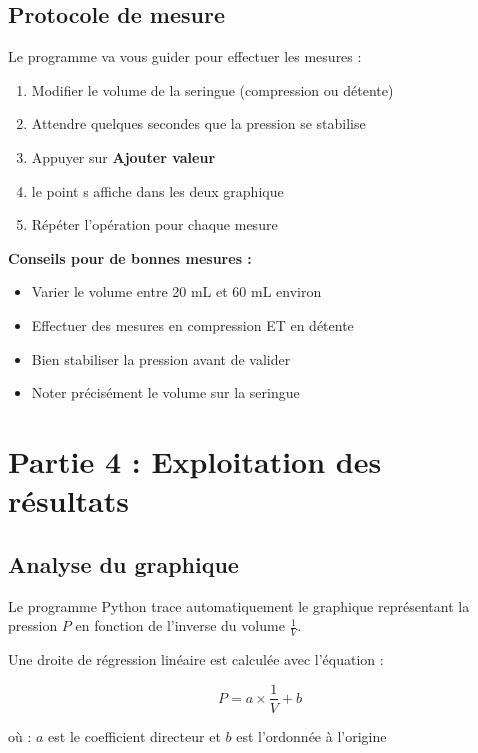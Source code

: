 \documentclass[11pt,a4paper]{article}
\begin{document}
\subsection{Protocole de mesure}

Le programme va vous guider pour effectuer les mesures :

\begin{enumerate}
    \item Modifier le volume de la seringue (compression ou détente)
    \item Attendre quelques secondes que la pression se stabilise
    \item Appuyer sur \textbf{Ajouter valeur}
    \item le point s affiche dans les deux graphique
    \item Répéter l'opération pour chaque mesure
\end{enumerate}

\begin{infobox}
\textbf{Conseils pour de bonnes mesures :}
\begin{itemize}
    \item Varier le volume entre 20 mL et 60 mL environ
    \item Effectuer des mesures en compression ET en détente
    \item Bien stabiliser la pression avant de valider
    \item Noter précisément le volume sur la seringue
\end{itemize}
\end{infobox}


\section{Partie 4 : Exploitation des résultats}

\subsection{Analyse du graphique}

Le programme Python trace automatiquement le graphique représentant la pression $P$ en fonction de l'inverse du volume $\frac{1}{V}$.

Une droite de régression linéaire est calculée avec l'équation :

$$P = a \times \frac{1}{V} + b$$

où :  $a$ est le coefficient directeur et  $b$ est l'ordonnée à l'origine
\end{document}
